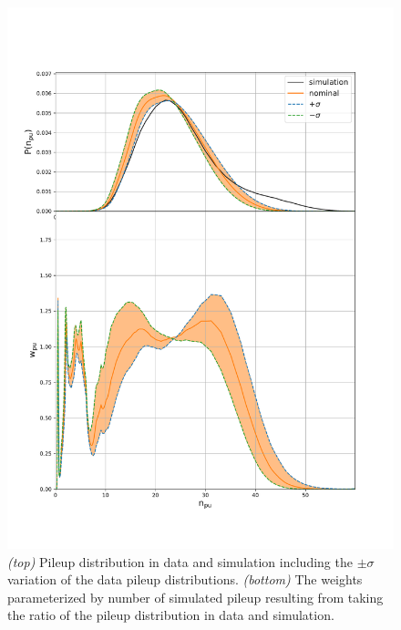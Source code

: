 \begin{figure}[ht]
    \centering
    \includegraphics[height=0.4\textheight]{chapters/Analysis/sectionCalibration/figures/generator/pileup_systematics}
    \caption{\emph{(top)} Pileup distribution in data and simulation including the $\pm\sigma$ variation of the data pileup distributions. \emph{(bottom)} The weights parameterized by number of simulated pileup resulting from taking the ratio of the pileup distribution in data and simulation. }
    \label{fig:analysis:calibration:pileup}
\end{figure}
\FloatBarrier




